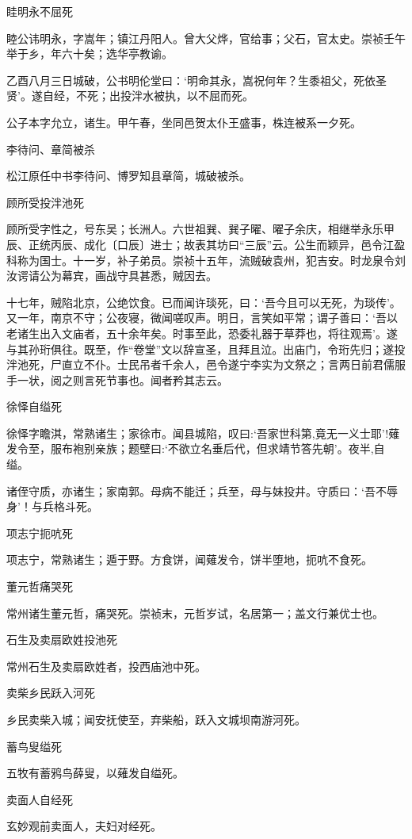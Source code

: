 \documentclass[]{article}
\begin{document}
眭明永不屈死

睦公讳明永，字嵩年；镇江丹阳人。曾大父烨，官给事；父石，官太史。崇祯壬午举于乡，年六十矣；选华亭教谕。

乙酉八月三日城破，公书明伦堂曰：`明命其永，嵩祝何年？生黍祖父，死依圣贤'。遂自经，不死；出投泮水被执，以不屈而死。

公子本字允立，诸生。甲午春，坐同邑贺太仆王盛事，株连被系一夕死。

李待问、章简被杀

松江原任中书李待问、博罗知县章简，城破被杀。

顾所受投泮池死

顾所受字性之，号东吴；长洲人。六世祖巽、巽子曜、曜子余庆，相继举永乐甲辰、正统丙辰、成化〔口辰〕进士；故表其坊曰``三辰''云。公生而颖异，邑令江盈科称为国士。十一岁，补子弟员。崇祯十五年，流贼破袁州，犯吉安。时龙泉令刘汝谔请公为幕宾，画战守具甚悉，贼因去。

十七年，贼陷北京，公绝饮食。已而闻许琰死，曰：`吾今且可以无死，为琰传'。又一年，南京不守；公夜寝，微闻嗟叹声。明日，言笑如平常；谓子善曰：`吾以老诸生出入文庙者，五十余年矣。时事至此，恐委礼器于草莽也，将往观焉'。遂与其孙珩俱往。既至，作``卷堂''文以辞宣圣，且拜且泣。出庙门，令珩先归；遂投泮池死，尸直立不仆。士民吊者千余人，邑令遂宁李实为文祭之；言两日前君儒服手一状，阅之则言死节事也。闻者矜其志云。

徐怿自缢死

徐怿字瞻淇，常熟诸生；家徐市。闻县城陷，叹曰:`吾家世科第,竟无一义士耶'!薙发令至，服布袍别亲族；题壁曰:`不欲立名垂后代，但求靖节答先朝'。夜半,自缢。

诸侄守质，亦诸生；家南郭。母病不能迁；兵至，母与妹投井。守质曰：`吾不辱身'！与兵格斗死。

项志宁扼吭死

项志宁，常熟诸生；遁于野。方食饼，闻薙发令，饼半堕地，扼吭不食死。

董元哲痛哭死

常州诸生董元哲，痛哭死。崇祯末，元哲岁试，名居第一；盖文行兼优士也。

石生及卖扇欧姓投池死

常州石生及卖扇欧姓者，投西庙池中死。

卖柴乡民跃入河死

乡民卖柴入城；闻安抚使至，弃柴船，跃入文城坝南游河死。

蓄鸟叟缢死

五牧有蓄鸦鸟薛叟，以薙发自缢死。

卖面人自经死

玄妙观前卖面人，夫妇对经死。
\end{document}
